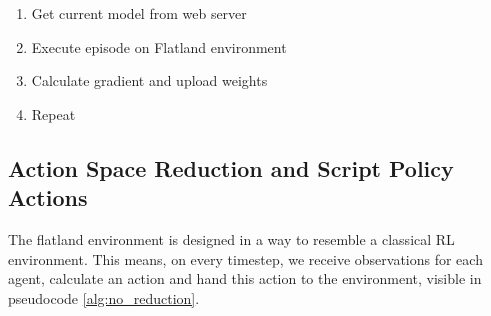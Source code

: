 \begin{enumerate}
	\item Get current model from web server
	\item Execute episode on Flatland environment
	\item Calculate gradient and upload weights
	\item Repeat
\end{enumerate}

\subsection*{Action Space Reduction and Script Policy Actions}\label{reduced_action_space}
The flatland environment is designed in a way to resemble a classical RL environment. This means, on every timestep, we receive observations for each agent, calculate an action and hand this action to the environment, visible in pseudocode \autoref{alg:no_reduction}. 


